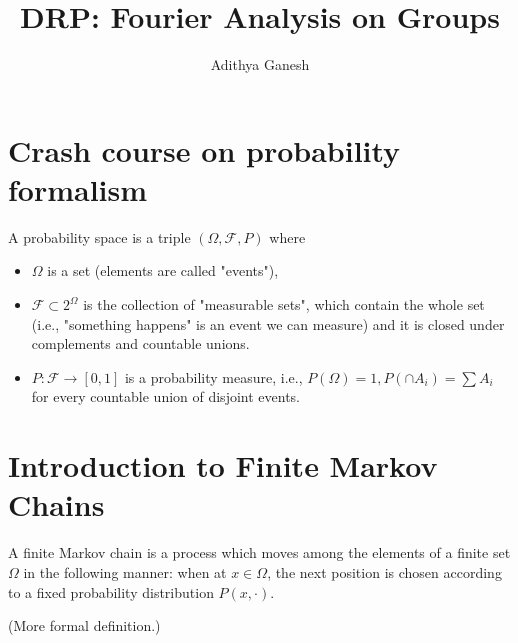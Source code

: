 \documentclass[12pt]{article}
\title{DRP: Fourier Analysis on Groups}
\author{Adithya Ganesh}
\begin{document}
\maketitle

\section{Crash course on probability formalism}
A probability space is a triple $(\Omega, \mathcal F, P)$ where 
\begin{itemize}
\item $\Omega$ is a set (elements are called "events"), 
\item $\mathcal F\subset 2^{\Omega}$ is the collection of "measurable sets", which contain the whole set (i.e., "something happens" is an event we can measure) and it is closed under complements and countable unions. 
\item $P:\mathcal F\rightarrow [0,1]$ is a probability measure, i.e., $P(\Omega)=1, P(\cap A_i)=\sum A_i$ for every countable union of disjoint events. 
\end{itemize}


\section{Introduction to Finite Markov Chains}

A finite Markov chain is a process which moves among the elements of a finite set $\Omega$ in the following manner: when at $x \in \Omega$, the next position is chosen according to a fixed probability distribution $P(x, \cdot)$.

(More formal definition.)

\begin{theorem}

\end{theorem}
\end{document}
